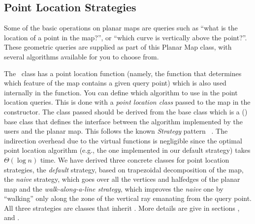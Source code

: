 \subsection{Point Location Strategies}
\label{PM_sec:point_location}
Some of the basic operations on planar maps are queries such as ``what
is the location of a point in the map?'', or ``which curve is
vertically above the point?''. These geometric queries are supplied as
part of this Planar Map class, with several algorithms available for
you to choose from.

The \ccClassTemplateName\ class has a point location function
(namely, the  function that determines which feature of the map 
contains a given query point)
which is also used internally in the  function.
You can define which algorithm to use in the
point location queries. This is done with a {\em point location class}
passed to the map in the constructor. The class passed should be derived
from the base class  which is a
() base class that defines the interface between the 
algorithm implemented by the users and the planar map. This follows the 
known {\it Strategy}
pattern ~\cite{ghjv-dpero-95}. The indirection overhead due to the virtual
functions is negligible since the optimal point location algorithm 
(e.g., the one implemented in our default strategy) takes $\Theta(\log n)$ time.
We have derived three concrete classes for point location strategies,
the {\it default\/} strategy, based on trapezoidal decomposition of the map,
the {\it naive\/} strategy, which goes over all the vertices and halfedges
of the planar map and the {\it walk-along-a-line strategy\/}, which improves
the {\it naive\/} one by ``walking'' only along the zone of the vertical ray
emanating from the query point. All three strategies are classes
that inherit .
More details are give in sections 
  , 
   and
  .


